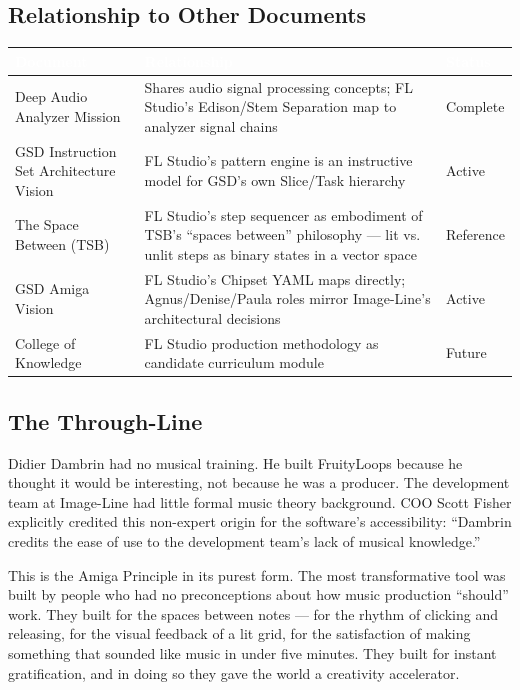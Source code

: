 \documentclass[11pt,letterpaper]{article}
\newcommand{\tableheader}[1]{\textbf{\sffamily\textcolor{white}{#1}}}
\begin{document}
\subsection{Relationship to Other Documents}

\begin{center}
\begin{tabularx}{\textwidth}{L{3.5cm}XC{2cm}}
\toprule
{}
\tableheader{Document} & \tableheader{Relationship} & \tableheader{Status} \\
\midrule
Deep Audio Analyzer Mission & Shares audio signal processing concepts; FL Studio's Edison/Stem Separation map to analyzer signal chains & Complete \\
GSD Instruction Set Architecture Vision & FL Studio's pattern engine is an instructive model for GSD's own Slice/Task hierarchy & Active \\
The Space Between (TSB) & FL Studio's step sequencer as embodiment of TSB's ``spaces between'' philosophy --- lit vs. unlit steps as binary states in a vector space & Reference \\
GSD Amiga Vision & FL Studio's Chipset YAML maps directly; Agnus/Denise/Paula roles mirror Image-Line's architectural decisions & Active \\
College of Knowledge & FL Studio production methodology as candidate curriculum module & Future \\
\bottomrule
\end{tabularx}
\end{center}

\subsection{The Through-Line}

Didier Dambrin had no musical training. He built FruityLoops because he thought it would be interesting, not because he was a producer. The development team at Image-Line had little formal music theory background. COO Scott Fisher explicitly credited this non-expert origin for the software's accessibility: ``Dambrin credits the ease of use to the development team's lack of musical knowledge.''

This is the Amiga Principle in its purest form. The most transformative tool was built by people who had no preconceptions about how music production ``should'' work. They built for the spaces between notes --- for the rhythm of clicking and releasing, for the visual feedback of a lit grid, for the satisfaction of making something that sounded like music in under five minutes. They built for instant gratification, and in doing so they gave the world a creativity accelerator.
\end{document}
